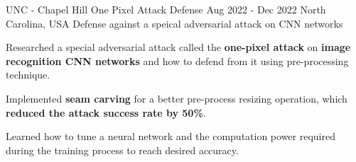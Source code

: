 

\begin{cventries}

  

  \cventry
    {UNC - Chapel Hill} %
    {One Pixel Attack Defense} %
    {Aug 2022 - Dec 2022} %
    {North Carolina, USA} %
    {Defense against a speical adversarial attack on CNN networks}
    {
      \begin{cvitems} %
        \item {Researched a special adversarial attack called the \textbf{one-pixel attack} on \textbf{image recognition CNN networks} and how to defend from it using pre-processing technique.}
        \item {Implemented \textbf{seam carving} for a better pre-process resizing operation, which \textbf{reduced the attack success rate by 50\%}.}
        \item {Learned how to tune a neural network and the computation power required during the training process to reach desired accuracy.}
      \end{cvitems}
    }


\end{cventries}
